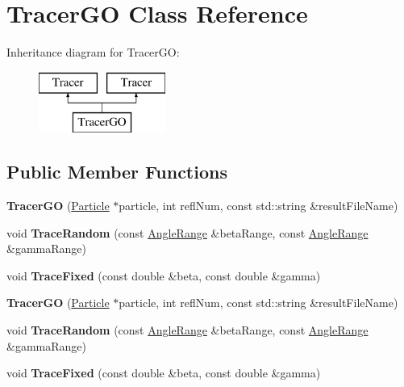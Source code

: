 \hypertarget{class_tracer_g_o}{}\section{Tracer\+GO Class Reference}
\label{class_tracer_g_o}
Inheritance diagram for Tracer\+GO\+:\begin{figure}[H]
\begin{center}
\leavevmode
\includegraphics[height=2.000000cm]{class_tracer_g_o}
\end{center}
\end{figure}
\subsection*{Public Member Functions}
\begin{DoxyCompactItemize}
\item 
\mbox{\label{class_tracer_g_o_ace4e11a1a2786d7e83e17576007aca58}} 
{\bfseries Tracer\+GO} (\mbox{\hyperlink{class_particle}{Particle}} $\ast$particle, int refl\+Num, const std\+::string \&result\+File\+Name)
\item 
\mbox{\label{class_tracer_g_o_a23f4c1a224e17fc620cf7fcef197716f}} 
void {\bfseries Trace\+Random} (const \mbox{\hyperlink{struct_angle_range}{Angle\+Range}} \&beta\+Range, const \mbox{\hyperlink{struct_angle_range}{Angle\+Range}} \&gamma\+Range)
\item 
\mbox{\label{class_tracer_g_o_a85ff51763a379abcc4fa84fba1093ef2}} 
void {\bfseries Trace\+Fixed} (const double \&beta, const double \&gamma)
\item 
\mbox{\label{class_tracer_g_o_ace4e11a1a2786d7e83e17576007aca58}} 
{\bfseries Tracer\+GO} (\mbox{\hyperlink{class_particle}{Particle}} $\ast$particle, int refl\+Num, const std\+::string \&result\+File\+Name)
\item 
\mbox{\label{class_tracer_g_o_a23f4c1a224e17fc620cf7fcef197716f}} 
void {\bfseries Trace\+Random} (const \mbox{\hyperlink{struct_angle_range}{Angle\+Range}} \&beta\+Range, const \mbox{\hyperlink{struct_angle_range}{Angle\+Range}} \&gamma\+Range)
\item 
\mbox{\label{class_tracer_g_o_a85ff51763a379abcc4fa84fba1093ef2}} 
void {\bfseries Trace\+Fixed} (const double \&beta, const double \&gamma)
\end{DoxyCompactItemize}
